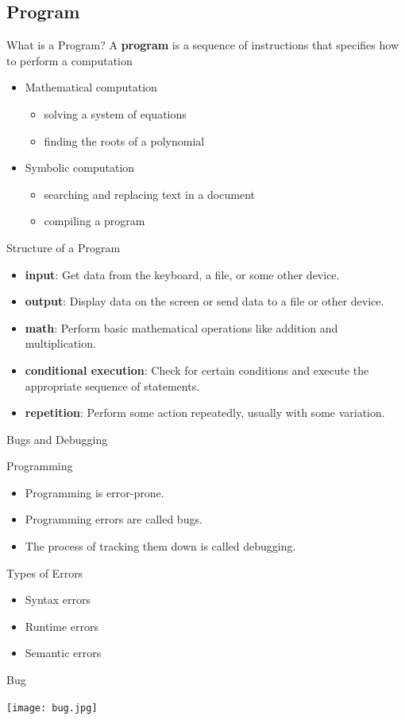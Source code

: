 \documentclass{beamer}
\begin{document}
\subsection{Program}
\begin{frame}{What is a Program?}
A {\bf program} is a sequence of instructions that specifies how to
perform a computation
\begin{itemize}[<+->]
\item Mathematical computation
\begin{itemize}
\item solving a system of equations
\item finding the
roots of a polynomial
\end{itemize}
\item Symbolic computation
\begin{itemize}
\item searching and replacing text in a document
\item compiling a program
\end{itemize}
\end{itemize}
\end{frame}
\begin{frame}{Structure of a Program}
\begin{itemize}
\item \textbf{input}: Get data from the keyboard, a file, or some
other device.
\item \textbf{output}: Display data on the screen or send data to a
file or other device.
\item \textbf{math}: Perform basic mathematical operations like addition and
multiplication.
\item \textbf{conditional execution}: Check for certain conditions and
execute the appropriate sequence of statements.
\item \textbf{repetition}: Perform some action repeatedly, usually with
some variation.
\end{itemize}
\end{frame}

\begin{frame}{Bugs and Debugging}

\begin{block}{Programming}
\begin{itemize}
\item Programming is \alert{error-prone}.
\item Programming errors are called \alert{bugs}. 
\item The process of tracking them down is called \alert{debugging}.
\end{itemize}
\end{block}
\begin{block}{Types of Errors}
\begin{itemize}
\item Syntax errors
\item Runtime errors
\item Semantic errors
\end{itemize}
\end{block}
\end{frame}
\begin{frame}{Bug}
\centerline{\texttt{[image: bug.jpg]}}
\end{frame}
\end{document}
